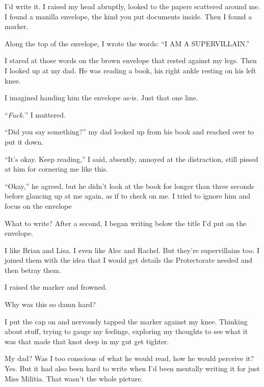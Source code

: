 I'd write it.  I raised my head abruptly, looked to the papers scattered around me.  I found a manilla envelope, the kind you put documents inside.  Then I found a marker.



Along the top of the envelope, I wrote the words: ``I AM A SUPERVILLAIN.''



I stared at those words on the brown envelope that rested against my legs.  Then I looked up at my dad.  He was reading a book, his right ankle resting on his left knee.



I imagined handing him the envelope as-is.  Just that one line.



``\emph{Fuck.}''  I muttered.



``Did you say something?'' my dad looked up from his book and reached over to put it down.



``It's okay.  Keep reading,'' I said, absently, annoyed at the distraction, still pissed at him for cornering me like this.



``Okay,'' he agreed, but he didn't look at the book for longer than three seconds before glancing up at me again, as if to check on me.  I tried to ignore him and focus on the envelope



What to write?  After a second, I began writing below the title I'd put on the envelope.



I like Brian and Lisa.  I even like Alec and Rachel.  But they're supervillains too.  I joined them with the idea that I would get details the Protectorate needed and then betray them.



I raised the marker and frowned.



Why was this so damn hard?



I put the cap on and nervously tapped the marker against my knee.  Thinking about stuff, trying to gauge my feelings, exploring my thoughts to see what it was that made that knot deep in my gut get tighter.



My dad?  Was I too conscious of what he would read, how he would perceive it?  Yes.  But it had also been hard to write when I'd been mentally writing it for just Miss Militia.  That wasn't the whole picture.



